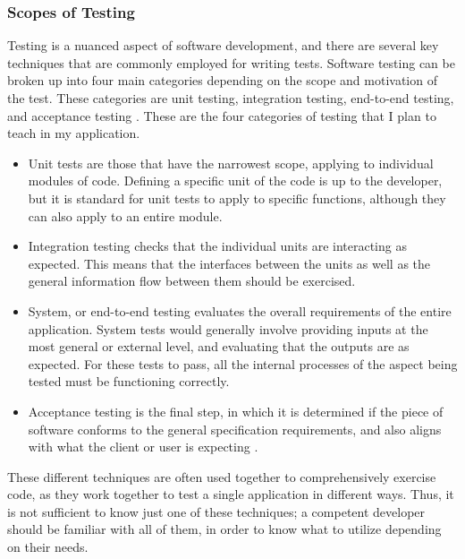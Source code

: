 \documentclass[10pt,twocolumn]{article}
\begin{document}
\subsubsection{Scopes of Testing}

Testing is a nuanced aspect of software development, and there are several key techniques that are commonly employed for 
writing tests. Software testing can be broken up into four main categories depending on the scope and motivation of the 
test. These categories are unit testing, integration testing, end-to-end testing, and acceptance testing 
\cite{Luo2001Article}. These are the four categories of testing that I plan to teach in my application.

\begin{itemize}
    \item{Unit tests are those that have the narrowest 
    scope, applying to individual modules of code. Defining a specific unit of the code is up to the 
    developer, but it is standard for unit tests to apply to specific functions, although they can also apply to an entire 
    module.}
    \item{Integration testing checks that the individual units are interacting as expected. This means that the interfaces 
    between the units as well as the general information flow between them should be exercised.}
    \item{System, or end-to-end 
    testing evaluates the overall requirements of the entire application. System tests would generally involve providing 
    inputs at the most general or external level, and evaluating that the outputs are as expected. For these tests to pass, 
    all the internal processes of the aspect being tested must be functioning correctly.}
    \item{Acceptance testing is the final 
    step, in which it is determined if the piece of software conforms to the general specification requirements, and also 
    aligns with what the client or user is expecting \cite{Luo2001Article}. }
\end{itemize}

These different techniques are often used together to comprehensively exercise code, as they work 
together to test a single application in different ways. Thus, it is not sufficient to know just one of these 
techniques; a competent developer should be familiar with all of them, in order to know what to utilize depending on 
their needs. 
   
\end{document}
